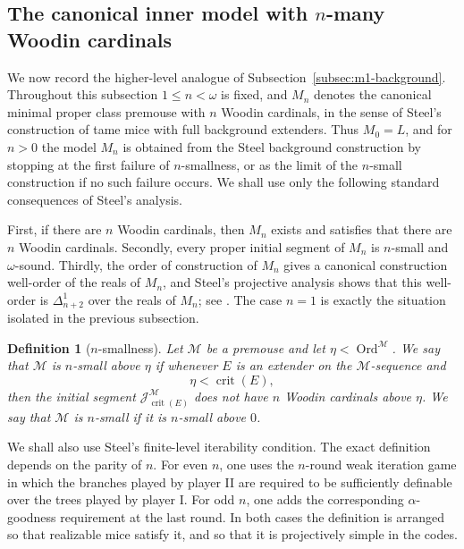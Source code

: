\documentclass[a4paper,11pt]{article}
\newtheorem{definition}[theorem]{Definition}
\begin{document}
\subsection{The canonical inner model with $n$-many Woodin cardinals}\label{subsec:mn-background}

We now record the higher-level analogue of Subsection~\ref{subsec:m1-background}.  Throughout this subsection $1\leq n<\omega$ is fixed, and $M_n$ denotes the canonical minimal proper class premouse with $n$ Woodin cardinals, in the sense of Steel's construction of tame mice with full background extenders.  Thus $M_0=L$, and for $n>0$ the model $M_n$ is obtained from the Steel background construction by stopping at the first failure of $n$-smallness, or as the limit of the $n$-small construction if no such failure occurs.  We shall use only the following standard consequences of Steel's analysis.

First, if there are $n$ Woodin cardinals, then $M_n$ exists and satisfies that there are $n$ Woodin cardinals.  Secondly, every proper initial segment of $M_n$ is $n$-small and $\omega$-sound.  Thirdly, the order of construction of $M_n$ gives a canonical construction well-order of the reals of $M_n$, and Steel's projective analysis shows that this well-order is $\Delta^1_{n+2}$ over the reals of $M_n$; see \cite{Steel2,Steel3}.  The case $n=1$ is exactly the situation isolated in the previous subsection.

\begin{definition}[$n$-smallness]\label{def:n-smallness-general}
Let $\mathcal M$ be a premouse and let $\eta<\operatorname{Ord}^{\mathcal M}$.  We say that $\mathcal M$ is \emph{$n$-small above $\eta$} if whenever $E$ is an extender on the $\mathcal M$-sequence and
\[
   \eta<\operatorname{crit}(E),
\]
then the initial segment $\mathcal J^{\mathcal M}_{\operatorname{crit}(E)}$ does not have $n$ Woodin cardinals above $\eta$.  We say that $\mathcal M$ is \emph{$n$-small} if it is $n$-small above $0$.
\end{definition}

We shall also use Steel's finite-level iterability condition.  The exact definition depends on the parity of $n$.  For even $n$, one uses the $n$-round weak iteration game in which the branches played by player II are required to be sufficiently definable over the trees played by player I.  For odd $n$, one adds the corresponding $\alpha$-goodness requirement at the last round.  In both cases the definition is arranged so that realizable mice satisfy it, and so that it is projectively simple in the codes.
\end{document}
